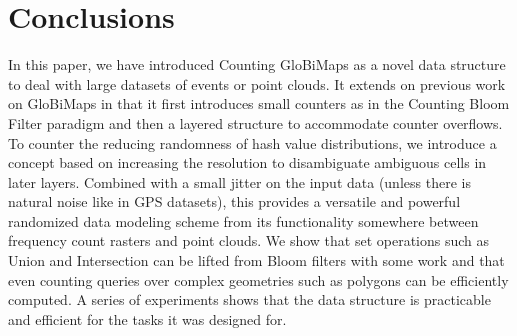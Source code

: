 \documentclass[sigconf]{acmart}
\begin{document}

\section{Conclusions}\label{conclusion}
\balance
In this paper, we have introduced Counting GloBiMaps as a novel data structure to deal with large datasets of events or point clouds. It extends on previous work on GloBiMaps in that it first introduces small counters as in the Counting Bloom Filter paradigm and then a layered structure to accommodate counter overflows. To counter the reducing randomness of hash value distributions, we introduce a concept based on increasing the resolution to disambiguate ambiguous cells in later layers. Combined with a small jitter on the input data (unless there is natural noise like in GPS datasets), this provides a versatile and powerful randomized data modeling scheme from its functionality somewhere between frequency count rasters and point clouds. We show that set operations such as Union and Intersection can be lifted from Bloom filters with some work and that even counting queries over complex geometries such as polygons can be efficiently computed. A series of experiments shows that the data structure is practicable and efficient for the tasks it was designed for.





\end{document}
